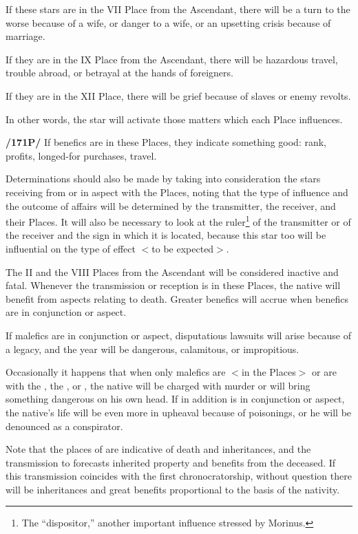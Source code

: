 If these stars are in the VII Place from the Ascendant, there will be a turn to the worse because of a wife, or danger to a wife, or an upsetting crisis because of marriage. 

If they are in the IX Place from the Ascendant, there will be hazardous travel, trouble abroad, or betrayal at the hands of foreigners. 

If they are in the XII Place, there will be grief because
of slaves or enemy revolts. 

In other words, the star will activate those matters which each Place influences.

\textbf{/171P/} If benefics are in these Places, they indicate something good: rank, profits, longed-for purchases, travel.

Determinations should also be made by taking into consideration the stars receiving from or in aspect with the Places, noting that the type of influence and the outcome of affairs will be determined by the transmitter, the receiver, and their Places.
It will also be necessary to look at the ruler\footnote{The ``dispositor,'' another important influence stressed by Morinus.} of the transmitter or of the receiver and the sign in which it is located, because this star too will be influential on the type of effect $<$to be expected$>$. 

The II and the VIII Places from the Ascendant will be considered inactive and fatal. Whenever the transmission or
reception is in these Places, the native will benefit from aspects relating to death. Greater benefics will accrue when benefics are in conjunction or aspect. 

If malefics are in conjunction or aspect, disputatious lawsuits will arise because of a legacy, and the year will be dangerous, calamitous, or impropitious.

Occasionally it happens that when only malefics are $<$in the Places$>$ or are with the \Sun, the \Moon, or \Mercury, the native will be charged with murder or will bring something dangerous on his own head. If in addition \Venus\xspace is in conjunction or aspect, the native’s life will be even more in upheaval because of poisonings, or he will be denounced as a conspirator. 

Note that the places of \Saturn\xspace are indicative of death and inheritances, and the transmission to \Jupiter\xspace forecasts inherited property and benefits from the deceased.
If this transmission coincides with the first chronocratorship, without question there will be inheritances and great benefits proportional to the basis of the nativity. 

